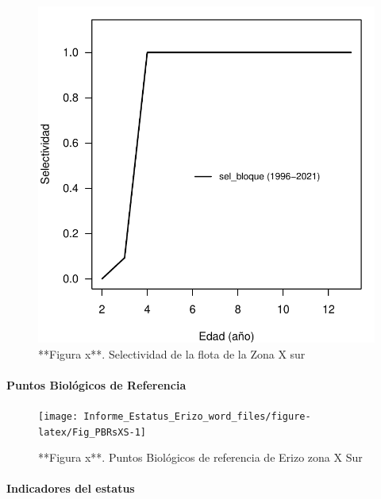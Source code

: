\documentclass[
]{article}
\begin{document}
\begin{figure}

{\centering \includegraphics{Figuras/Fig_SelFlotaXS-1} 

}

\caption{**Figura x**. Selectividad de la flota de la Zona X sur}\label{fig:Fig_SelFlotaXS}
\end{figure}

\hypertarget{puntos-bioluxf3gicos-de-referencia-1}{%
\paragraph{Puntos Biológicos de
Referencia}\label{puntos-bioluxf3gicos-de-referencia-1}}

\begin{figure}

{\centering \texttt{[image: Informe\_Estatus\_Erizo\_word\_files/figure-latex/Fig\_PBRsXS-1]} 

}

\caption{**Figura x**. Puntos Biológicos de referencia de Erizo zona X Sur}\label{fig:Fig_PBRsXS}
\end{figure}

\hypertarget{indicadores-del-estatus}{%
\paragraph{Indicadores del estatus}\label{indicadores-del-estatus}}
\end{document}
